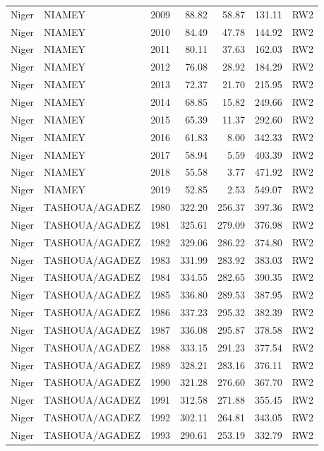 \begin{longtable}{lllrrrl}
  Niger & NIAMEY & 2009 & 88.82 & 58.87 & 131.11 & RW2 \\ 
  Niger & NIAMEY & 2010 & 84.49 & 47.78 & 144.92 & RW2 \\ 
  Niger & NIAMEY & 2011 & 80.11 & 37.63 & 162.03 & RW2 \\ 
  Niger & NIAMEY & 2012 & 76.08 & 28.92 & 184.29 & RW2 \\ 
  Niger & NIAMEY & 2013 & 72.37 & 21.70 & 215.95 & RW2 \\ 
  Niger & NIAMEY & 2014 & 68.85 & 15.82 & 249.66 & RW2 \\ 
  Niger & NIAMEY & 2015 & 65.39 & 11.37 & 292.60 & RW2 \\ 
  Niger & NIAMEY & 2016 & 61.83 & 8.00 & 342.33 & RW2 \\ 
  Niger & NIAMEY & 2017 & 58.94 & 5.59 & 403.39 & RW2 \\ 
  Niger & NIAMEY & 2018 & 55.58 & 3.77 & 471.92 & RW2 \\ 
  Niger & NIAMEY & 2019 & 52.85 & 2.53 & 549.07 & RW2 \\ 
  Niger & TASHOUA/AGADEZ & 1980 & 322.20 & 256.37 & 397.36 & RW2 \\ 
  Niger & TASHOUA/AGADEZ & 1981 & 325.61 & 279.09 & 376.98 & RW2 \\ 
  Niger & TASHOUA/AGADEZ & 1982 & 329.06 & 286.22 & 374.80 & RW2 \\ 
  Niger & TASHOUA/AGADEZ & 1983 & 331.99 & 283.92 & 383.03 & RW2 \\ 
  Niger & TASHOUA/AGADEZ & 1984 & 334.55 & 282.65 & 390.35 & RW2 \\ 
  Niger & TASHOUA/AGADEZ & 1985 & 336.80 & 289.53 & 387.95 & RW2 \\ 
  Niger & TASHOUA/AGADEZ & 1986 & 337.23 & 295.32 & 382.39 & RW2 \\ 
  Niger & TASHOUA/AGADEZ & 1987 & 336.08 & 295.87 & 378.58 & RW2 \\ 
  Niger & TASHOUA/AGADEZ & 1988 & 333.15 & 291.23 & 377.54 & RW2 \\ 
  Niger & TASHOUA/AGADEZ & 1989 & 328.21 & 283.16 & 376.11 & RW2 \\ 
  Niger & TASHOUA/AGADEZ & 1990 & 321.28 & 276.60 & 367.70 & RW2 \\ 
  Niger & TASHOUA/AGADEZ & 1991 & 312.58 & 271.88 & 355.45 & RW2 \\ 
  Niger & TASHOUA/AGADEZ & 1992 & 302.11 & 264.81 & 343.05 & RW2 \\ 
  Niger & TASHOUA/AGADEZ & 1993 & 290.61 & 253.19 & 332.79 & RW2 \\ 

\end{longtable}
